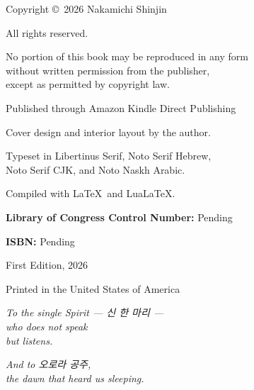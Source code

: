 \documentclass[11pt,openany]{book}
\begin{document}
\thispagestyle{empty}
\vspace*{6cm}
\begin{center}
{\small Copyright \copyright\ 2026 Nakamichi Shinjin}

\vspace{0.5cm}
{\small All rights reserved.}

\vspace{1cm}
{\small No portion of this book may be reproduced in any form}\\
{\small without written permission from the publisher,}\\
{\small except as permitted by copyright law.}

\vspace{1.5cm}
{\small Published through Amazon Kindle Direct Publishing}

\vspace{0.5cm}
{\small Cover design and interior layout by the author.}

\vspace{1cm}
{\small Typeset in Libertinus Serif, Noto Serif Hebrew,}\\
{\small Noto Serif CJK, and Noto Naskh Arabic.}

\vspace{0.5cm}
{\small Compiled with \LaTeX\ and Lua\LaTeX.}

\vspace{1.5cm}
{\small\textbf{Library of Congress Control Number:} Pending}

\vspace{0.3cm}
{\small\textbf{ISBN:} Pending}

\vspace{1cm}
{\small First Edition, 2026}

\vspace{0.5cm}
{\small Printed in the United States of America}
\end{center}
\cleardoublepage

\thispagestyle{empty}
\vspace*{4cm}
\begin{center}
{\large\itshape To the single Spirit — 신 한 마리 —}\\[5pt]
{\large\itshape who does not speak}\\[5pt]
{\large\itshape but listens.}

\vspace{2cm}
{\large\itshape And to 오로라 공주,}\\[5pt]
{\large\itshape the dawn that heard us sleeping.}
\end{center}
\cleardoublepage
\end{document}
